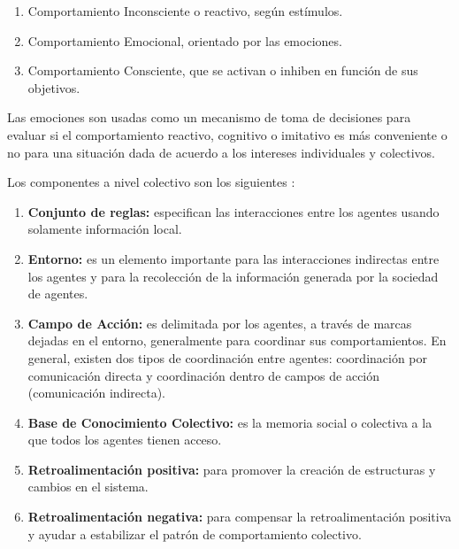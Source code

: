 
\begin{enumerate}
\item Comportamiento Inconsciente o reactivo, según estímulos.
\item Comportamiento Emocional, orientado por las emociones.
\item Comportamiento Consciente, que se activan o inhiben en función de sus objetivos.
\end{enumerate}

Las emociones son usadas como un mecanismo de toma de decisiones para evaluar si
el comportamiento reactivo, cognitivo o imitativo es más conveniente o no para
una situación dada de acuerdo a los intereses individuales y colectivos.


Los componentes a nivel colectivo son los siguientes :

\begin{enumerate}
\item \textbf{Conjunto de reglas:} especifican las interacciones
entre los agentes usando solamente información local.
\item \textbf{Entorno:} es un elemento importante para las interacciones indirectas entre los agentes y
para la recolección de la información generada por la sociedad de agentes.
\item \textbf{Campo de Acción:} es delimitada por los agentes, a través de marcas
dejadas en el entorno, generalmente para coordinar sus comportamientos. En
general, existen dos tipos de coordinación entre agentes: coordinación por
comunicación directa y coordinación dentro de campos de acción (comunicación
indirecta).
\item \textbf{Base de Conocimiento Colectivo:} es la memoria social
o colectiva a la que todos los agentes tienen acceso.
\item \textbf{Retroalimentación positiva:} para promover la creación de estructuras y
cambios en el sistema.
\item \textbf{Retroalimentación negativa:} para compensar
la retroalimentación positiva y ayudar a estabilizar el patrón de comportamiento
colectivo.
\end{enumerate}

